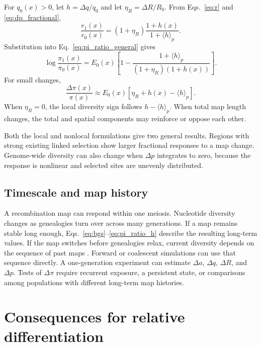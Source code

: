 \documentclass[11pt]{article}
\theoremstyle{remark}
\newcommand{\avg}[1]{\langle #1 \rangle}
\begin{document}
For $q_0(x)>0$, let $h=\Delta q/q_0$ and let
$\eta_R=\Delta R/R_0$. From Eqs.~\eqref{eq:r} and
\eqref{eq:dp_fractional},
\begin{equation}
\frac{r_1(x)}{r_0(x)}
=(1+\eta_R)
\frac{1+h(x)}{1+\avg{h}_p}.
\label{eq:r_ratio}
\end{equation}
Substitution into Eq.~\eqref{eq:pi_ratio_general} gives
\begin{equation}
\boxed{\;
\log\frac{\pi_1(x)}{\pi_0(x)}
=E_0(x)
\left[
1-\frac{1+\avg{h}_p}
{(1+\eta_R)(1+h(x))}
\right].
\;}
\label{eq:pi_ratio_h}
\end{equation}
For small changes,
\begin{equation}
\frac{\Delta\pi(x)}{\pi(x)}
\approx
E_0(x)\left[\eta_R+h(x)-\avg{h}_p\right].
\label{eq:pi_firstorder}
\end{equation}
When $\eta_R=0$, the local diversity sign follows
$h-\avg{h}_p$. When total map length changes, the total and spatial components may
reinforce or oppose each other.

Both the local and nonlocal formulations give two general results. Regions with
strong existing linked selection show larger fractional responses to a map change.
Genome-wide diversity can also change when $\Delta p$ integrates to zero, because
the response is nonlinear and selected sites are unevenly distributed.

\subsection{Timescale and map history}
\label{sec:timescale}

A recombination map can respond within one meiosis. Nucleotide diversity changes
as genealogies turn over across many generations. If a map remains stable long
enough, Eqs.~\eqref{eq:bgs}--\eqref{eq:pi_ratio_h} describe the resulting long-term
values. If the map switches before genealogies relax, current diversity depends
on the sequence of past maps \citep{booker2022}. Forward or coalescent simulations
can use that sequence directly. A one-generation experiment can estimate
$\Delta a$, $\Delta q$, $\Delta R$, and $\Delta p$. Tests of $\Delta\pi$ require
recurrent exposure, a persistent state, or comparisons among populations with
different long-term map histories.

\section{Consequences for relative differentiation}
\label{sec:divergence}
\end{document}
